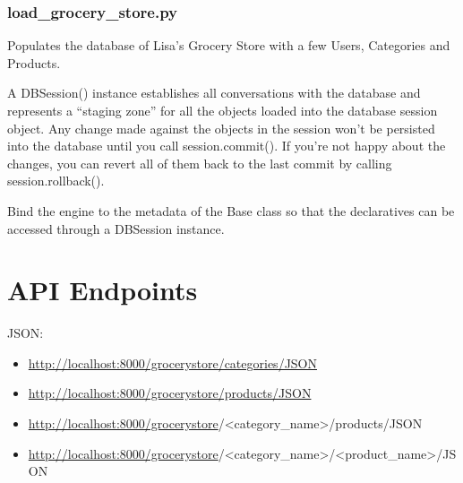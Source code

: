 \documentclass[letterpaper,10pt,english]{sphinxmanual}
\begin{document}
\subsection{load\_grocery\_store.py}
\label{load_grocery_store:module-load_grocery_store}\label{load_grocery_store:load-grocery-store-py}\label{load_grocery_store::doc}
Populates the database of Lisa's Grocery Store with a few
Users, Categories and Products.

\begin{fulllineitems}
\label{load_grocery_store:load_grocery_store.DBSession}
A DBSession() instance establishes all conversations with the database
and represents a ``staging zone'' for all the objects loaded into the
database session object. Any change made against the objects in the
session won't be persisted into the database until you call
session.commit(). If you're not happy about the changes, you can
revert all of them back to the last commit by calling
session.rollback().

\end{fulllineitems}


\begin{fulllineitems}
\label{load_grocery_store:load_grocery_store.engine}
Bind the engine to the metadata of the Base class so that the
declaratives can be accessed through a DBSession instance.

\end{fulllineitems}



\chapter{API Endpoints}
\label{index:api-endpoints}
JSON:
\begin{itemize}
\item {} 
\href{http://localhost:8000/grocerystore/categories/JSON}{http://localhost:8000/grocerystore/categories/JSON}

\item {} 
\href{http://localhost:8000/grocerystore/products/JSON}{http://localhost:8000/grocerystore/products/JSON}

\item {} 
\href{http://localhost:8000/grocerystore}{http://localhost:8000/grocerystore}/\textless{}category\_name\textgreater{}/products/JSON

\item {} 
\href{http://localhost:8000/grocerystore}{http://localhost:8000/grocerystore}/\textless{}category\_name\textgreater{}/\textless{}product\_name\textgreater{}/JSON

\end{itemize}
\end{document}
